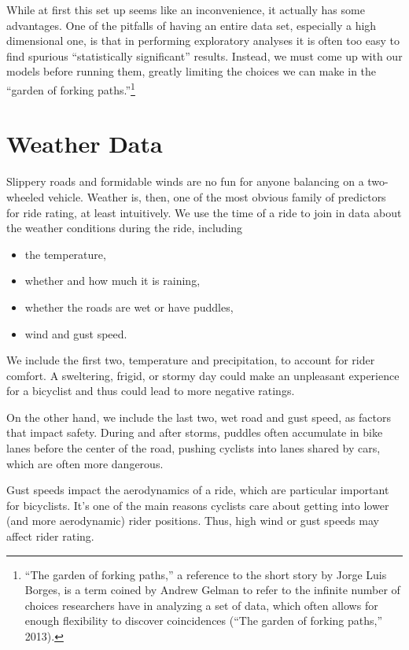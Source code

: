 \documentclass[12pt,twoside]{reedthesis}
\providecommand{\tightlist}{%
  \setlength{\itemsep}{0pt}\setlength{\parskip}{0pt}}
\begin{document}
  While at first this set up seems like an inconvenience, it actually has
  some advantages. One of the pitfalls of having an entire data set,
  especially a high dimensional one, is that in performing exploratory
  analyses it is often too easy to find spurious ``statistically
  significant'' results. Instead, we must come up with our models before
  running them, greatly limiting the choices we can make in the ``garden
  of forking paths.''\footnote{``The garden of forking paths,'' a
    reference to the short story by Jorge Luis Borges, is a term coined by
    Andrew Gelman to refer to the infinite number of choices researchers
    have in analyzing a set of data, which often allows for enough
    flexibility to discover coincidences (``The garden of forking paths,''
    2013).}
  
  \section{Weather Data}\label{weather-data}
  
  Slippery roads and formidable winds are no fun for anyone balancing on a
  two-wheeled vehicle. Weather is, then, one of the most obvious family of
  predictors for ride rating, at least intuitively. We use the time of a
  ride to join in data about the weather conditions during the ride,
  including
  
  \begin{itemize}
  \tightlist
  \item
    the temperature,
  \item
    whether and how much it is raining,
  \item
    whether the roads are wet or have puddles,
  \item
    wind and gust speed.
  \end{itemize}
  
  We include the first two, temperature and precipitation, to account for
  rider comfort. A sweltering, frigid, or stormy day could make an
  unpleasant experience for a bicyclist and thus could lead to more
  negative ratings.
  
  On the other hand, we include the last two, wet road and gust speed, as
  factors that impact safety. During and after storms, puddles often
  accumulate in bike lanes before the center of the road, pushing cyclists
  into lanes shared by cars, which are often more dangerous.
  
  Gust speeds impact the aerodynamics of a ride, which are particular
  important for bicyclists. It's one of the main reasons cyclists care
  about getting into lower (and more aerodynamic) rider positions. Thus,
  high wind or gust speeds may affect rider rating.
  
\end{document}
